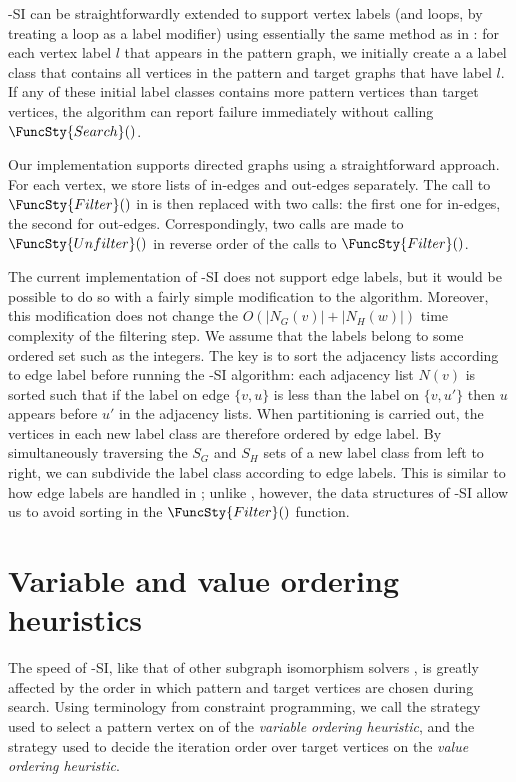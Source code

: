 \McSplit-SI can be straightforwardly extended to support vertex labels (and loops, by
treating a loop as a label modifier) using essentially
the same method as in \McSplit: for each vertex label $l$ that appears in the pattern graph,
we initially create a a label class that contains all vertices in the pattern and target
graphs that have label $l$.  If any of these initial label classes contains more pattern vertices
than target vertices, the algorithm can report failure immediately without calling
$\FuncSty{Search}()$.

Our implementation supports directed graphs using a straightforward approach.  For each
vertex, we store lists of in-edges and out-edges separately.  The call to $\FuncSty{Filter}()$
in  is then replaced with two calls: the first one for in-edges, the second
for out-edges.  Correspondingly, two calls are made to $\FuncSty{Unfilter}()$ in reverse
order of the calls to $\FuncSty{Filter}()$.

The current implementation of \McSplit-SI does not support edge labels, but it
would be possible to do so with a fairly simple modification to the algorithm.
Moreover, this modification does not change the
$O(|N_G(v)| + |N_H(w)|)$ time complexity of the filtering step.  We assume that
the labels belong to some ordered set such as the integers.  The key is to sort
the adjacency lists according to edge label before running the \McSplit-SI
algorithm: each adjacency list $N(v)$ is sorted such that if the label on edge
$\{v,u\}$ is less than the label on $\{v,u'\}$ then $u$ appears before $u'$ in
the adjacency lists.  When partitioning is carried out, the
vertices in each new label class are therefore ordered by edge label.
By simultaneously
traversing the $S_G$ and $S_H$ sets of a new label class from left to right, we
can subdivide the label class according to edge labels.  This is similar to how
edge labels are handled in \McSplit; unlike \McSplit, however, the
data structures of \McSplit-SI allow us to avoid sorting in the $\FuncSty{Filter}()$
function.

\section{Variable and value ordering heuristics}\label{sec:mcsplit-si-heuristics}

The speed of \McSplit-SI, like that of other subgraph isomorphism solvers
\cite{DBLP:journals/tcbb/BonniciG17,DBLP:journals/jair/McCreeshPST18},
is greatly affected by the order
in which pattern and target vertices are chosen during search.
Using terminology from constraint programming, we call the strategy
used to select a pattern vertex on  of
 the \emph{variable ordering heuristic}, and the
strategy used to decide the iteration order over target vertices on
 the \emph{value ordering heuristic}.


